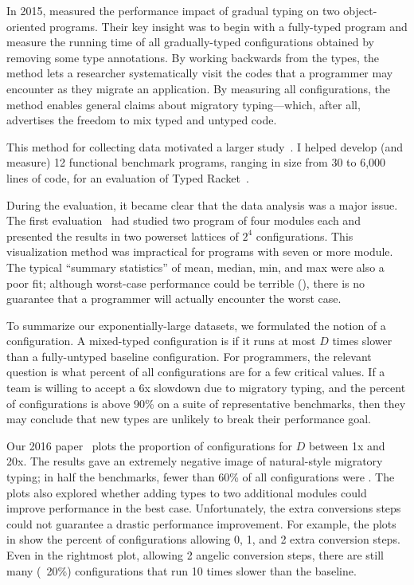 In 2015,  measured the performance impact of gradual typing on
 two object-oriented programs.
Their key insight was to begin with a fully-typed program and measure the
 running time of all gradually-typed configurations obtained by removing
 some type annotations.
By working backwards from the types, the method lets a researcher systematically
 visit the codes that a programmer may encounter as they migrate an
 application.
By measuring all configurations, the method enables general claims about
 migratory typing---which, after all, advertises the freedom to mix typed
 and untyped code.

This method for collecting data motivated a larger study~\cite{stop}.
I helped develop (and measure) 12 functional benchmark programs, ranging in
 size from 30 to 6,000 lines of code, for an evaluation of Typed
 Racket~\cite{popl}.

During the evaluation, it became clear that the data analysis was a major
 issue.
The first evaluation~\cite{ecoop} had studied two program of four modules each
 and presented the results in two powerset lattices of $2^4$ configurations.
This visualization method was impractical for programs with seven or more
 module.
The typical ``summary statistics'' of mean, median, min, and max were also a
 poor fit; although worst-case performance could be terrible
 (), there is no guarantee that a programmer
 will actually encounter the worst case.

To summarize our exponentially-large datasets, we formulated the notion
 of a  configuration.
A mixed-typed configuration is  if it runs at most $D$ times
 slower than a fully-untyped baseline configuration.
For programmers, the relevant question is what percent of all configurations
 are  for a few critical values.
If a team is willing to accept a 6x slowdown due to migratory typing,
 and the percent of  configurations is above 90\% on a suite
 of representative benchmarks, then they may conclude that new types are
 unlikely to break their performance goal.

Our 2016 paper~\cite{todo} plots the proportion of  configurations
 for $D$ between 1x and 20x.
The results gave an extremely negative image of natural-style migratory typing;
 in half the benchmarks, fewer than 60\% of all configurations were
 .
The plots also explored whether adding types to two additional modules could
 improve performance in the best case.
Unfortunately, the extra conversions steps could not guarantee a drastic
 performance improvement.
For example, the plots in  show the percent of
  configurations allowing 0, 1, and 2 extra conversion steps.
Even in the rightmost plot, allowing 2 angelic conversion steps, there are
 still many (~20\%) configurations that run 10 times slower than the baseline.

